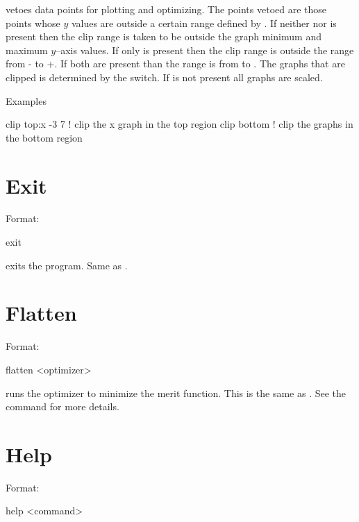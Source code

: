 \vskip 0.2in 
 vetoes data points for plotting and optimizing. The points
vetoed are those points whose $y$ values are outside a certain range
defined by  . If neither  nor
 is present then the clip range is taken to be outside
the graph minimum and maximum $y$--axis values. If only 
is present then the clip range is outside the range from
- to +. If both are present than the range
is from  to .  The graphs that are clipped
is determined by the  switch.  If  is not
present all graphs are scaled.

Examples
\begin{example}
  clip top:x -3  7  ! clip the x graph in the top region
  clip bottom       ! clip the graphs in the bottom region
\end{example}

\section{Exit}
\label{s:exit}

Format:
\begin{example}
  exit
\end{example}

\vskip 0.2in
 exits the program. Same as .

\section{Flatten}
\label{s:flatten}

Format:
\begin{example}
  flatten <optimizer>
\end{example}

\vskip 0.2in
 runs the optimizer to minimize the merit function. This is the 
same as . See the  command for more details.

\section{Help}
\label{s:help}

Format:
\begin{example}
  help <command>
\end{example}

